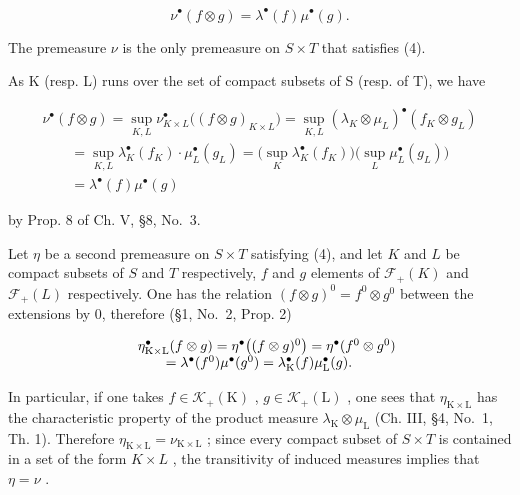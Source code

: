 \[
\nu^ {\bullet} (f \otimes g) = \lambda^ {\bullet} (f) \mu^ {\bullet} (g).\tag{4}
\]

The premeasure \(\nu\) is the only premeasure on \(S \times T\) that satisfies (4).

As K (resp. L) runs over the set of compact subsets of S (resp. of T), we have

\[
\begin{array}{l} \nu^ {\bullet} (f \otimes g) = \sup _ {K, L} \nu_ {K \times L} ^ {\bullet} \big ((f \otimes g) _ {K \times L} \big) = \sup _ {K, L} (\lambda_ {K} \otimes \mu_ {L}) ^ {\bullet} (f _ {K} \otimes g _ {L}) \\ \qquad = \sup _ {K, L} \lambda_ {K} ^ {\bullet} (f _ {K}) \cdot \mu_ {L} ^ {\bullet} (g _ {L}) = \big (\sup _ {K} \lambda_ {K} ^ {\bullet} (f _ {K}) \big) \big (\sup _ {L} \mu_ {L} ^ {\bullet} (g _ {L}) \big) \\ \qquad = \lambda^ {\bullet} (f) \mu^ {\bullet} (g) \end{array}
\]

by Prop. 8 of Ch. V, §8, No.~3.

Let \(\eta\) be a second premeasure on \(S \times T\) satisfying (4), and let \(K\) and \(L\) be compact subsets of \(S\) and \(T\) respectively, \(f\) and \(g\) elements of \(\mathcal{F}_{+}(K)\) and \(\mathcal{F}_{+}(L)\) respectively. One has the relation \((f \otimes g)^{0} = f^{0} \otimes g^{0}\) between the extensions by 0, therefore (§1, No.~2, Prop. 2)

\[
\begin{array}{r l} & {\eta_ {\mathrm{K} \times \mathrm{L}} ^ {\bullet} (f \otimes g) = \eta^ {\bullet} \big ((f \otimes g) ^ {0} \big) = \eta^ {\bullet} (f ^ {0} \otimes g ^ {0})} \\ & {\qquad = \lambda^ {\bullet} (f ^ {0}) \mu^ {\bullet} (g ^ {0}) = \lambda_ {\mathrm{K}} ^ {\bullet} (f) \mu_ {\mathrm{L}} ^ {\bullet} (g).} \end{array}
\]

In particular, if one takes \(f \in \mathcal{K}_{+}(\mathrm{K})\) , \(g \in \mathcal{K}_{+}(\mathrm{L})\) , one sees that \(\eta_{\mathrm{K} \times \mathrm{L}}\) has the characteristic property of the product measure \(\lambda_{\mathrm{K}} \otimes \mu_{\mathrm{L}}\) (Ch. III, §4, No.~1, Th. 1). Therefore \(\eta_{\mathrm{K} \times \mathrm{L}} = \nu_{\mathrm{K} \times \mathrm{L}}\) ; since every compact subset of \(S \times T\) is contained in a set of the form \(K \times L\) , the transitivity of induced measures implies that \(\eta = \nu\) .

